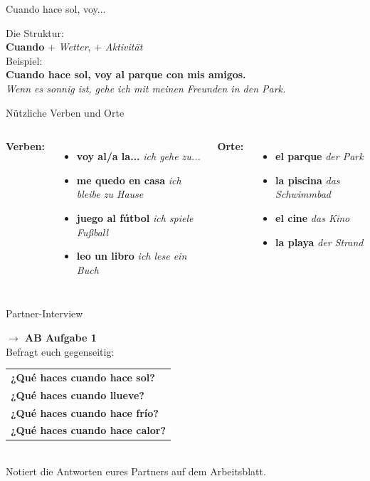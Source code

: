\documentclass[aspectratio=169,11pt]{beamer}
\newcommand{\es}[1]{\textcolor{spanisch}{\textbf{#1}}}
\newcommand{\de}[1]{\textcolor{dunkelgrau}{\textit{#1}}}
\begin{document}
\begin{frame}{Cuando hace sol, voy...}
\begin{center}
{\Large Die Struktur:}\\[0.5cm]
{\LARGE \es{Cuando} + \textit{Wetter}, + \textit{Aktivität}}\\[1cm]
\pause
{\Large Beispiel:}\\[0.3cm]
{\Large \es{Cuando hace sol, voy al parque con mis amigos.}}\\
{\normalsize \de{Wenn es sonnig ist, gehe ich mit meinen Freunden in den Park.}}
\end{center}
\end{frame}

\begin{frame}{Nützliche Verben und Orte}
\begin{columns}
\textbf{Verben:}
\begin{itemize}
\item \es{voy al/a la...} \de{ich gehe zu...}
\item \es{me quedo en casa} \de{ich bleibe zu Hause}
\item \es{juego al fútbol} \de{ich spiele Fußball}
\item \es{leo un libro} \de{ich lese ein Buch}
\end{itemize}

\textbf{Orte:}
\begin{itemize}
\item \es{el parque} \de{der Park}
\item \es{la piscina} \de{das Schwimmbad}
\item \es{el cine} \de{das Kino}
\item \es{la playa} \de{der Strand}
\end{itemize}
\end{columns}
\end{frame}

\begin{frame}{Partner-Interview}
\begin{center}
{\Large\bfseries $\rightarrow$ AB Aufgabe 1}\\[0.8cm]
{\Large Befragt euch gegenseitig:}\\[0.5cm]
\begin{tabular}{l}
\es{¿Qué haces cuando hace sol?} \\[0.5em]
\es{¿Qué haces cuando llueve?} \\[0.5em]
\es{¿Qué haces cuando hace frío?} \\[0.5em]
\es{¿Qué haces cuando hace calor?} \\
\end{tabular}
\\[0.8cm]
{\normalsize Notiert die Antworten eures Partners auf dem Arbeitsblatt.}
\end{center}
\end{frame}
\end{document}
